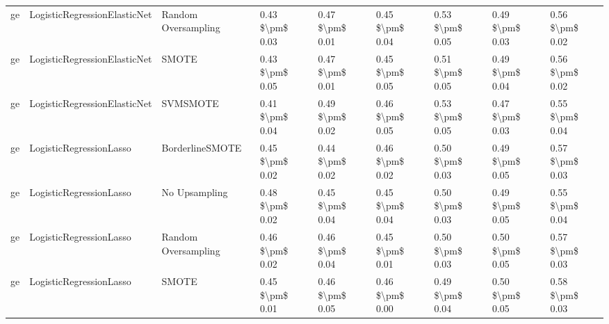 \begin{tabular}{lllllllll}
      ge &    LogisticRegressionElasticNet &           Random Oversampling & 0.43 \$\textbackslash pm\$ 0.03 &           0.47 \$\textbackslash pm\$ 0.01 &       0.45 \$\textbackslash pm\$ 0.04 &        0.53 \$\textbackslash pm\$ 0.05 &                         0.49 \$\textbackslash pm\$ 0.03 &     0.56 \$\textbackslash pm\$ 0.02 \\
      ge &    LogisticRegressionElasticNet &                         SMOTE & 0.43 \$\textbackslash pm\$ 0.05 &           0.47 \$\textbackslash pm\$ 0.01 &       0.45 \$\textbackslash pm\$ 0.05 &        0.51 \$\textbackslash pm\$ 0.05 &                         0.49 \$\textbackslash pm\$ 0.04 &     0.56 \$\textbackslash pm\$ 0.02 \\
      ge &    LogisticRegressionElasticNet &                      SVMSMOTE & 0.41 \$\textbackslash pm\$ 0.04 &           0.49 \$\textbackslash pm\$ 0.02 &       0.46 \$\textbackslash pm\$ 0.05 &        0.53 \$\textbackslash pm\$ 0.05 &                         0.47 \$\textbackslash pm\$ 0.03 &     0.55 \$\textbackslash pm\$ 0.04 \\
      ge &         LogisticRegressionLasso &               BorderlineSMOTE & 0.45 \$\textbackslash pm\$ 0.02 &           0.44 \$\textbackslash pm\$ 0.02 &       0.46 \$\textbackslash pm\$ 0.02 &        0.50 \$\textbackslash pm\$ 0.03 &                         0.49 \$\textbackslash pm\$ 0.05 &     0.57 \$\textbackslash pm\$ 0.03 \\
      ge &         LogisticRegressionLasso &                 No Upsampling & 0.48 \$\textbackslash pm\$ 0.02 &           0.45 \$\textbackslash pm\$ 0.04 &       0.45 \$\textbackslash pm\$ 0.04 &        0.50 \$\textbackslash pm\$ 0.03 &                         0.49 \$\textbackslash pm\$ 0.05 &     0.55 \$\textbackslash pm\$ 0.04 \\
      ge &         LogisticRegressionLasso &           Random Oversampling & 0.46 \$\textbackslash pm\$ 0.02 &           0.46 \$\textbackslash pm\$ 0.04 &       0.45 \$\textbackslash pm\$ 0.01 &        0.50 \$\textbackslash pm\$ 0.03 &                         0.50 \$\textbackslash pm\$ 0.05 &     0.57 \$\textbackslash pm\$ 0.03 \\
      ge &         LogisticRegressionLasso &                         SMOTE & 0.45 \$\textbackslash pm\$ 0.01 &           0.46 \$\textbackslash pm\$ 0.05 &       0.46 \$\textbackslash pm\$ 0.00 &        0.49 \$\textbackslash pm\$ 0.04 &                         0.50 \$\textbackslash pm\$ 0.05 &     0.58 \$\textbackslash pm\$ 0.03 \\

\end{tabular}
